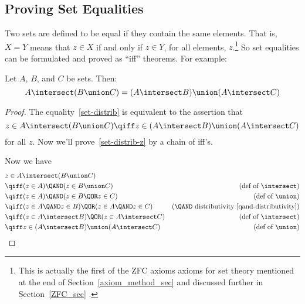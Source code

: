 \subsection{Proving Set Equalities}

Two sets are defined to be equal if they contain the same elements.
That is, $X = Y$ means that $z \in X$ if and only if $z \in Y$, for
all elements, $z$.\footnote{This is actually the first of the ZFC
  axioms axioms for set theory mentioned at the end of
  Section~\ref{axiom_method_sec} and discussed further in
  Section~\ref{ZFC_sec} .}  So set equalities can be formulated and
proved as ``iff'' theorems.  For example:

\begin{theorem}
Let $A$, $B$, and $C$ be sets.  Then:
\begin{equation}\label{set-distrib}
A \intersect (B \union C) = (A \intersect B) \union (A \intersect C)
\end{equation}
\end{theorem}

\begin{proof}
The equality~\eqref{set-distrib} is equivalent to the assertion that
\begin{equation}\label{set-distrib-z}
  z \in A \intersect (B \union C) \qiff z \in (A \intersect B)
  \union (A \intersect C)
\end{equation}
for all $z$.  Now we'll prove~\eqref{set-distrib-z} by a chain of iff's.

\iffalse
First we need a rule for distributing a propositional $\QAND$ operation
over an $\QOR$ operation.  It's easy to verify by truth-table that
\begin{lemma}\label{prop-distrib}
The propositional formula
\[
P \QAND (Q \QOR R)
\]
and
\[
(P \QAND Q) \QOR (P \QAND R)
\]
are equivalent.
\end{lemma}
\fi

Now we have
\begin{align*}
\lefteqn{z \in A \intersect (B \union C)}\\
& \qiff (z \in A) \QAND (z \in B \union C) & \text{(def of $\intersect$)}\\
& \qiff (z \in A) \QAND (z \in B \QOR z \in C)
                & \text{(def of $\union$)}\\
& \qiff (z \in A \QAND z \in B) \QOR (z \in A \QAND z \in C)
                & \text{(\QAND\ distributivity~\eqref{qand-distributivity})}\\  %
& \qiff (z \in A \intersect B) \QOR (z \in A \intersect C)
                & \text{(def of $\intersect$)}\\
& \qiff z \in (A \intersect B) \union (A \intersect C)
                & \text{(def of $\union$)}
\end{align*}

\end{proof}
  
